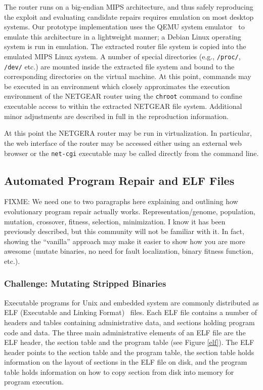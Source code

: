 \documentclass{sigcomm-alternate}
\begin{document}
The router runs on a big-endian MIPS architecture, and thus safely
reproducing the exploit and evaluating candidate repairs requires emulation
on most desktop systems. Our prototype implementation uses the QEMU system
emulator~\cite{bellard2005qemu} to emulate this architecture in a
lightweight manner; a Debian Linux operating system is run in emulation.
The extracted router file system is copied into the emulated MIPS Linux
system.  A number of special directories (e.g., \texttt{/proc/},
\texttt{/dev/} etc.) are mounted inside the extracted file system and bound
to the corresponding directories on the virtual machine.  At this point,
commands may be executed in an environment which closely approximates the
execution environment of the NETGEAR router using the \texttt{chroot}
command to confine executable access to within the extracted NETGEAR file
system. Additional minor adjustments are described in full in the
reproduction information.

At this point the NETGERA router may be run in virtualization.  In
particular, the web interface of the router may be accessed either using an
external web browser or the \texttt{net-cgi} executable may be called
directly from the command line.

\subsection{Automated Program Repair and ELF Files}
\label{sec-3-2}

FIXME: We need one to two paragraphs here explaining and outlining how
evolutionary program repair actually works. Representation/genome, population,
mutation, crossover, fitness, selection, minimization. I know it has been
previously described, but this community will not be familiar with it. In
fact, showing the ``vanilla'' approach may make it easier to show how you
are more awesome (mutate binaries, no need for fault localization, binary
fitness function, etc.). 

\subsubsection{Challenge: Mutating Stripped Binaries}

Executable programs for Unix and embedded system are commonly distributed
as ELF (Executable and Linking Format)~\cite{tis1995tool} files. 
Each ELF file contains a number of headers
and tables containing administrative data, and sections holding
program code and data.  The three main administrative elements of an
ELF file are the ELF header, the section table and the program table
(see Figure \ref{elf}).  The ELF header points to the section table and the
program table, the section table holds information on the layout of
sections in the ELF file on disk, and the program table holds
information on how to copy section from disk into memory for program
execution.
\end{document}
